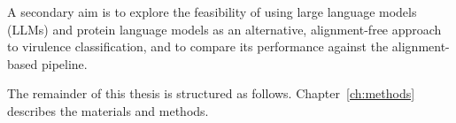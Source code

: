 A secondary aim is to explore the feasibility of using large language models (LLMs)
and protein language models as an alternative, alignment-free approach to virulence
classification, and to compare its performance against the alignment-based pipeline.

The remainder of this thesis is structured as follows.
Chapter~\ref{ch:methods} describes the materials and methods.
